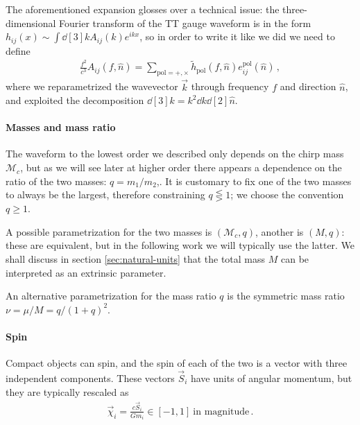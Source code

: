 \documentclass[main.tex]{subfiles}
\begin{document}
The aforementioned expansion glosses over a technical issue: the three-dimensional Fourier transform of the \ac{TT} gauge waveform is in the form \(h_{ij}(x) \sim \int \dd[3]{k} A_{ij}(k) e^{ikx}\), so in order to write it like we did we need to define 
%
\begin{align}
\frac{f^2}{c^3} A_{ij} (f, \hat{n}) = \sum _{\text{pol}= +, \times }
\widetilde{h}_{\text{pol}} (f, \hat{n}) e^{\text{pol}}_{ij}(\hat{n})
\,,
\end{align}
%
where we reparametrized the wavevector \(\vec{k}\) through frequency \(f\) and direction \(\hat{n}\), and exploited the decomposition \(\dd[3]{k} = k^2 \dd{k} \dd[2]{\hat{n}}\).

\paragraph{Masses and mass ratio}

The waveform to the lowest order we described only depends on the chirp mass \(\mathcal{M}_c\), but as we will see later at higher order there appears a dependence on the ratio of the two masses: \(q = m_1 / m_2 \),. 
It is customary to fix one of the two masses to always be the largest, therefore constraining \(q \lesseqgtr 1\); we choose the convention \(q \geq 1\).

A possible parametrization for the two masses is \((\mathcal{M}_c, q)\), another is \((M, q)\): these are equivalent, but in the following work we will typically use the latter. 
We shall discuss in section \ref{sec:natural-units} that the total mass \(M\) can be interpreted as an extrinsic parameter.

An alternative parametrization for the mass ratio \(q\) is the symmetric mass ratio \(\nu = \mu / M = q / (1 + q)^2\).



\paragraph{Spin}

Compact objects can spin, and the spin of each of the two is a vector with three independent components. 
These vectors \(\vec{S}_i\) have units of angular momentum, but they are typically rescaled as 
%
\begin{align}
\vec{\chi}_i = \frac{c\vec{S}_i}{G m_i} \in [-1, 1] 
\ \text{in magnitude}
\,.
\end{align}
\end{document}
